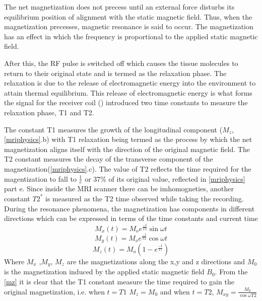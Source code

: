 \documentclass[msthesis.tex]{subfiles}
\begin{document}
The net magnetization does not precess until an external force disturbs its equilibrium position of alignment with the static magnetic field. Thus, when the magnetization precesses, magnetic resonance is said to occur. The magnetization has an effect in which the frequency is proportional to the applied static magnetic field.

After this, the RF pulse is switched off which causes the tissue molecules to return to their original state and is termed as the relaxation phase. The relaxation is due to the release of electromagnetic energy into the environment to attain thermal equilibrium. This release of electromagnetic energy is what forms the signal for the receiver coil (\cite{PhysRev.70.460}) introduced two time constants to measure the relaxation phase, T1 and T2.

The constant T1  measures the growth of the longitudinal component  ($M_z$, \autoref{mriphysics}.b) with T1 relaxation being termed as the process by which the net magnetization aligns itself with the direction of the original magnetic field. The T2 constant measures the decay of the transverse component of the magnetization(\autoref{mriphysics}.c). The value of T2 reflects the time required for the magentization to fall to $\frac{1}{e}$ or 37\% of its original value, reflected in  \autoref{mriphysics} part e. Since inside the MRI scanner there can be imhomogneties, another constant $T2^*$ is measured as the T2 time observed while taking the recording.
During the resonance phenomena, the magnetization has components in different directions which can be expressed in terms of the time constants and current time
\begin{equation}
    M_x(t) = M_o e^{\frac{−t}{T2}} \sin{ \omega t}
    \label{mx}
\end{equation}
\begin{equation}
    M_y(t) = M_o e^{\frac{-t}{T2}} \cos{\omega {t}}
    \label{my}
\end{equation}
\begin{equation}
    M_z(t) = M_o (1 − e^{{\frac{−t}{T1}}})
    \label{mz}
\end{equation}
Where $M_x$ ,$M_y$, $M_z$ are the magnetizations along the x,y and z directions and $M_0$ is the magnetization induced by the applied static magnetic field $B_0$. From the \autoref{mz} it is clear that the T1 constant measure the time required to gain the original magnetization, i.e. when $t=T1$
$M_z = M_0$ and when $t=T2$, $M_{xy} = \frac{M_0}{\cos{\omega T2}}$
\end{document}
